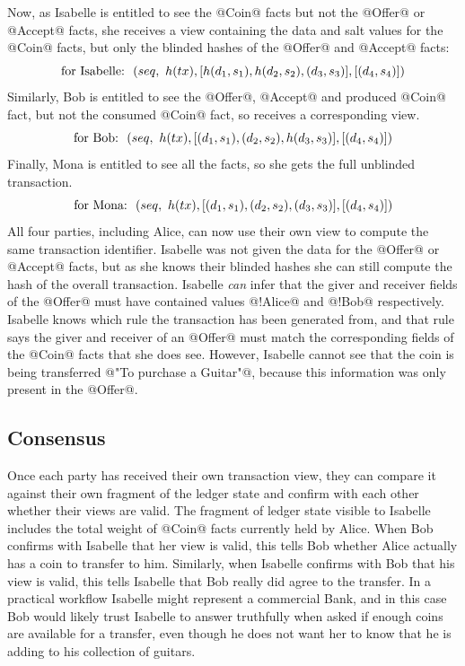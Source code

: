Now, as Isabelle is entitled to see the @Coin@ facts but not the @Offer@ or @Accept@ facts, she receives a view containing the data and salt values for the @Coin@ facts, but only the blinded hashes of the @Offer@ and @Accept@ facts:
$$
\textrm{for Isabelle:}~~(seq,~ h(tx), [h(d_1, s_1), h(d_2, s_2), (d_3, s_3)], [(d_4, s_4)])
$$
Similarly, Bob is entitled to see the @Offer@, @Accept@ and produced @Coin@ fact, but not the consumed @Coin@ fact, so receives a corresponding view.
$$
\textrm{for Bob:}~~(seq,~ h(tx), [(d_1, s_1), (d_2, s_2), h(d_3, s_3)], [(d_4, s_4)])
$$
Finally, Mona is entitled to see all the facts, so she gets the full unblinded transaction.
$$
\textrm{for Mona:}~~(seq,~ h(tx), [(d_1, s_1), (d_2, s_2), (d_3, s_3)], [(d_4, s_4)])
$$
All four parties, including Alice, can now use their own view to compute the same transaction identifier. Isabelle was not given the data for the @Offer@ or @Accept@ facts, but as she knows their blinded hashes she can still compute the hash of the overall transaction. Isabelle \emph{can} infer that the giver and receiver fields of the @Offer@ must have contained values @!Alice@ and @!Bob@ respectively. Isabelle knows which rule the transaction has been generated from, and that rule says the giver and receiver of an @Offer@ must match the corresponding fields of the @Coin@ facts that she does see. However, Isabelle cannot see that the coin is being transferred @"To purchase a Guitar"@, because this information was only present in the @Offer@.


\subsection{Consensus}
Once each party has received their own transaction view, they can compare it against their own fragment of the ledger state and confirm with each other whether their views are valid. The fragment of ledger state visible to Isabelle includes the total weight of @Coin@ facts currently held by Alice. When Bob confirms with Isabelle that her view is valid, this tells Bob whether Alice actually has a coin to transfer to him. Similarly, when Isabelle confirms with Bob that his view is valid, this tells Isabelle that Bob really did agree to the transfer. In a practical workflow Isabelle might represent a commercial Bank, and in this case Bob would likely trust Isabelle to answer truthfully when asked if enough coins are available for a transfer, even though he does not want her to know that he is adding to his collection of guitars.

